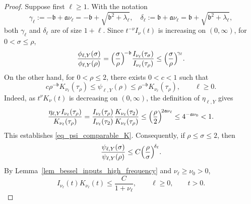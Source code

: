 \documentclass[10pt,a4paper]{amsart}
\begin{document}
\begin{proof}
Suppose first $\ell\ge 1$. With the notation
\begin{equation*}
\gamma_\ell:= -\mathfrak b+\mathfrak a\nu_\ell = -\mathfrak b+\sqrt{\mathfrak b^2+\lambda_\ell},\quad \delta_\ell := \mathfrak b+\mathfrak a\nu_\ell = \mathfrak b+\sqrt{\mathfrak b^2+\lambda_\ell},
\end{equation*}
both $\gamma_\ell$ and $\delta_\ell$ are of size $1+\ell$. Since $t^{-\nu}I_\nu(t)$ is increasing on $(0,\infty)$, for
$0<\sigma\leq\rho$,
\begin{equation}\label{eq_phi_ratio}
    \frac{\phi_{\ell,Y}(\sigma)}{\phi_{\ell,Y}(\rho)}
    =
    \Bigl(\frac{\sigma}{\rho}\Bigr)^{\!-\mathfrak b}
    \frac{I_{\nu_\ell}(\tau_\sigma)}{I_{\nu_\ell}(\tau_\rho)}
    \le
    \Bigl(\frac{\sigma}{\rho}\Bigr)^{\!\gamma_\ell}.
\end{equation}
On the other hand, for $0<\rho\le 2$, there exists $0<c<1$ such that
\begin{equation}\label{eq_psi_comparable_K}
    c\rho^{-\mathfrak b}K_{\nu_\ell}(\tau_\rho)
    \le
    \psi_{\ell,Y}(\rho)
    \le
    \rho^{-\mathfrak b}K_{\nu_\ell}(\tau_\rho),\qquad \ell \ge 0.
\end{equation}
Indeed, as $t^\nu K_\nu(t)$ is decreasing on $(0,\infty)$, the definition of $\eta_{\ell,Y}$ gives
\begin{equation*}
\frac{\eta_{\ell,Y}I_{\nu_\ell}(\tau_\rho)}{K_{\nu_\ell}(\tau_\rho)} =
\frac{I_{\nu_\ell}(\tau_\rho)}{I_{\nu_\ell}(\tau_2)}
\frac{K_{\nu_\ell}(\tau_2)}{K_{\nu_\ell}(\tau_\rho)}\le
\Bigl(\frac{\rho}{2}\Bigr)^{\!2\mathfrak a\nu_\ell}\le
4^{-\mathfrak a\nu_0} < 1.
\end{equation*}
This establishes \eqref{eq_psi_comparable_K}. Consequently, if $\rho\le \sigma \le 2$, then
\begin{equation}\label{eq_psi_ratio}
    \frac{\psi_{\ell,Y}(\sigma)}{\psi_{\ell,Y}(\rho)}
    \leq
    C
    \Bigl(\frac{\rho}{\sigma}\Bigr)^{\!\delta_\ell}.
\end{equation}
By Lemma~\ref{lem_bessel_inputs_high_frequency} and $\nu_\ell \ge \nu_0 >0$,
\begin{equation}\label{eq_IK_product_bound}
I_{\nu_\ell} (t) K_{\nu_\ell} (t) \le \frac{C}{1+\nu_\ell}, \qquad \ell \ge 0, \qquad t>0.
\end{equation}

\end{proof}
\end{document}
